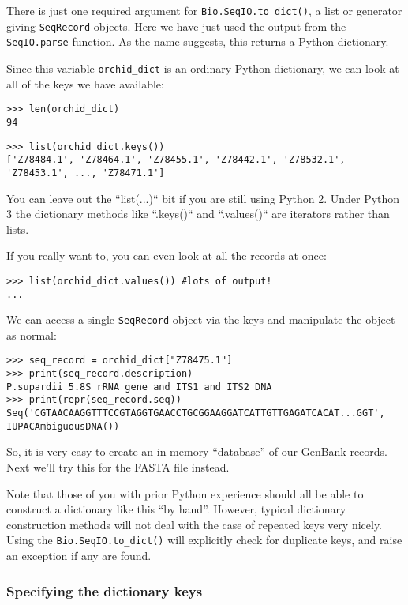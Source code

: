 There is just one required argument for \verb|Bio.SeqIO.to_dict()|, a list or
generator giving \verb|SeqRecord| objects. Here we have just used the output
from the \verb|SeqIO.parse| function. As the name suggests, this returns a
Python dictionary.

Since this variable \verb|orchid_dict| is an ordinary Python dictionary,
we can look at all of the keys we have available:

\begin{verbatim}
>>> len(orchid_dict)
94
\end{verbatim}
\begin{verbatim}
>>> list(orchid_dict.keys())
['Z78484.1', 'Z78464.1', 'Z78455.1', 'Z78442.1', 'Z78532.1', 'Z78453.1', ..., 'Z78471.1']
\end{verbatim}

You can leave out the ``list(...)`` bit if you are still using Python 2.
Under Python 3 the dictionary methods like ``.keys()`` and ``.values()``
are iterators rather than lists.

If you really want to, you can even look at all the records at once:
\begin{verbatim}
>>> list(orchid_dict.values()) #lots of output!
...
\end{verbatim}

We can access a single \verb|SeqRecord| object via the keys and manipulate the object as normal:

\begin{verbatim}
>>> seq_record = orchid_dict["Z78475.1"]
>>> print(seq_record.description)
P.supardii 5.8S rRNA gene and ITS1 and ITS2 DNA
>>> print(repr(seq_record.seq))
Seq('CGTAACAAGGTTTCCGTAGGTGAACCTGCGGAAGGATCATTGTTGAGATCACAT...GGT', IUPACAmbiguousDNA())
\end{verbatim}

So, it is very easy to create an in memory ``database'' of our GenBank records.  Next we'll try this for the FASTA file instead.

Note that those of you with prior Python experience should all be able to construct a dictionary like this ``by hand''.  However, typical dictionary construction methods will not deal with the case of repeated keys very nicely.  Using the \verb|Bio.SeqIO.to_dict()| will explicitly check for duplicate keys, and raise an exception if any are found.

\subsubsection{Specifying the dictionary keys}
\label{sec:seqio-todict-functionkey}

